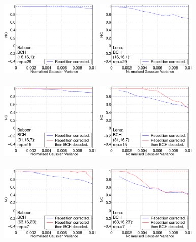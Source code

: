 \documentclass[12pt]{report}
\begin{document}
\begin{figure}[p]
\setlength{\abovecaptionskip}{-0.25cm}

\centerline{ \hbox{
\includegraphics[height=3.81cm,width=4.8cm]{EPS_BK_formattedBetter/WGbab16.eps}
\includegraphics[height=3.81cm,width=4.8cm]{EPS_BK_formattedBetter/WGlen16.eps} \\
}}
 
\centerline{ \hbox{
\includegraphics[height=3.81cm,width=4.8cm]{EPS_BK_formattedBetter/WGbab31.eps}
\includegraphics[height=3.81cm,width=4.8cm]{EPS_BK_formattedBetter/WGlen31.eps} \\
}}

\centerline{ \hbox{
\includegraphics[height=3.81cm,width=4.8cm]{EPS_BK_formattedBetter/WGbab63.eps}
\includegraphics[height=3.81cm,width=4.8cm]{EPS_BK_formattedBetter/WGlen63.eps} \\
}}
 

\end{figure}
\end{document}
